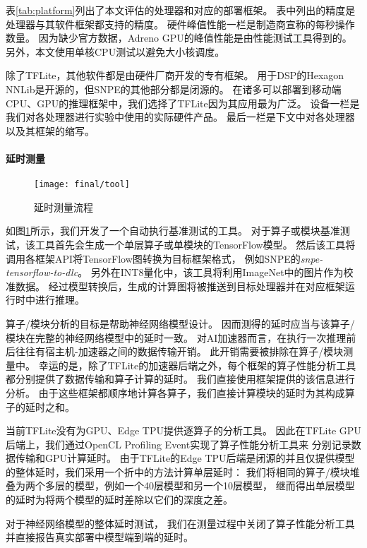 
表\ref{tab:platform}列出了本文评估的处理器和对应的部署框架。
表中列出的精度是处理器与其软件框架都支持的精度。
硬件峰值性能一栏是制造商宣称的每秒操作数量。
因为缺少官方数据，Adreno GPU的峰值性能是由性能测试工具\cite{clpeak}得到的。
另外，本文使用单核CPU测试以避免大小核调度。

除了TFLite，其他软件都是由硬件厂商开发的专有框架。
用于DSP的Hexagon NNLib是开源的，但SNPE的其他部分都是闭源的。
在诸多可以部署到移动端CPU、GPU的推理框架中，我们选择了TFLite因为其应用最为广泛\cite{xu2019first}。
设备一栏是我们对各处理器进行实验中使用的实际硬件产品。
最后一栏是下文中对各处理器以及其框架的缩写。

\paragraph{延时测量}

\begin{figure}[htbp]
    \centering
    \texttt{[image: final/tool]}
    \caption{\label{fig:tool}延时测量流程}
\end{figure}

如图\ref{fig:tool}所示，我们开发了一个自动执行基准测试的工具。
对于算子或模块基准测试，该工具首先会生成一个单层算子或单模块的TensorFlow模型。
然后该工具将调用各框架API将TensorFlow图转换为目标框架格式，
例如SNPE的\emph{snpe-tensorflow-to-dlc}。
另外在INT8量化中，该工具将利用ImageNet中的图片作为校准数据。
经过模型转换后，生成的计算图将被推送到目标处理器并在对应框架运行时中进行推理。

算子/模块分析的目标是帮助神经网络模型设计。
因而测得的延时应当与该算子/模块在完整的神经网络模型中的延时一致。
对AI加速器而言，在执行一次推理前后往往有宿主机-加速器之间的数据传输开销。
此开销需要被排除在算子/模块测量中。
幸运的是，除了TFLite的加速器后端之外，每个框架的算子性能分析工具都分别提供了数据传输和算子计算的延时。
我们直接使用框架提供的该信息进行分析。
由于这些框架都顺序地计算各算子，我们直接计算模块的延时为其构成算子的延时之和。

当前TFLite没有为GPU、Edge TPU提供逐算子的分析工具。
因此在TFLite GPU后端上，我们通过OpenCL Profiling Event实现了算子性能分析工具来
分别记录数据传输和GPU计算延时。
由于TFLite的Edge TPU后端是闭源的并且仅提供模型的整体延时，我们采用一个折中的方法计算单层延时：
我们将相同的算子/模块堆叠为两个多层的模型，例如一个40层模型和另一个10层模型，
继而得出单层模型的延时为将两个模型的延时差除以它们的深度之差。

对于神经网络模型的整体延时测试，
我们在测量过程中关闭了算子性能分析工具并直接报告真实部署中模型端到端的延时。